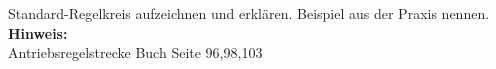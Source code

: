 \begin{question}[section=4,name={Standard Regelkreis},difficulty=,type=mdl,tags={}]
	Standard-Regelkreis aufzeichnen und erklären. Beispiel aus der Praxis nennen.
	\\ \textbf{Hinweis:}\\
	Antriebsregelstrecke Buch Seite 96,98,103
\end{question}
\begin{solution}
	
\end{solution}